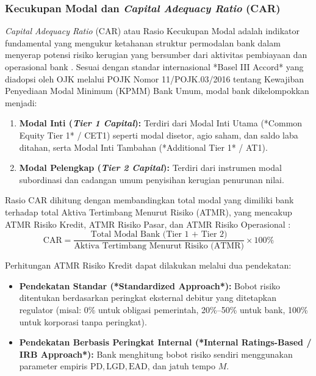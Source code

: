 \documentclass[12pt,a4paper]{article}
\numberwithin{equation}{section}
\begin{document}
\subsubsection{Kecukupan Modal dan \emph{Capital Adequacy Ratio} (CAR)}
\noindent
\emph{Capital Adequacy Ratio} (CAR) atau Rasio Kecukupan Modal adalah indikator fundamental yang mengukur ketahanan struktur permodalan bank dalam menyerap potensi risiko kerugian yang bersumber dari aktivitas pembiayaan dan operasional bank \citep{BrighamEhrhardt2020}. Sesuai dengan standar internasional *Basel III Accord* yang diadopsi oleh OJK melalui POJK Nomor 11/POJK.03/2016 tentang Kewajiban Penyediaan Modal Minimum (KPMM) Bank Umum, modal bank dikelompokkan menjadi:
\begin{enumerate}
  \item \textbf{Modal Inti (\emph{Tier 1 Capital}):} Terdiri dari Modal Inti Utama (*Common Equity Tier 1* / CET1) seperti modal disetor, agio saham, dan saldo laba ditahan, serta Modal Inti Tambahan (*Additional Tier 1* / AT1).
  \item \textbf{Modal Pelengkap (\emph{Tier 2 Capital}):} Terdiri dari instrumen modal subordinasi dan cadangan umum penyisihan kerugian penurunan nilai.
\end{enumerate}

\noindent
Rasio CAR dihitung dengan membandingkan total modal yang dimiliki bank terhadap total Aktiva Tertimbang Menurut Risiko (ATMR), yang mencakup ATMR Risiko Kredit, ATMR Risiko Pasar, dan ATMR Risiko Operasional \citep{Dendawijaya2015, HaryantoSudarno2023}:
\begin{equation}
  \text{CAR} = \frac{\text{Total Modal Bank (Tier 1 + Tier 2)}}{\text{Aktiva Tertimbang Menurut Risiko (ATMR)}} \times 100\%
\end{equation}

\noindent
Perhitungan ATMR Risiko Kredit dapat dilakukan melalui dua pendekatan:
\begin{itemize}
  \item \textbf{Pendekatan Standar (*Standardized Approach*):} Bobot risiko ditentukan berdasarkan peringkat eksternal debitur yang ditetapkan regulator (misal: 0\% untuk obligasi pemerintah, 20\%--50\% untuk bank, 100\% untuk korporasi tanpa peringkat).
  \item \textbf{Pendekatan Berbasis Peringkat Internal (*Internal Ratings-Based / IRB Approach*):} Bank menghitung bobot risiko sendiri menggunakan parameter empiris $\text{PD}, \text{LGD}, \text{EAD}$, dan jatuh tempo $M$.
\end{itemize}
\end{document}

